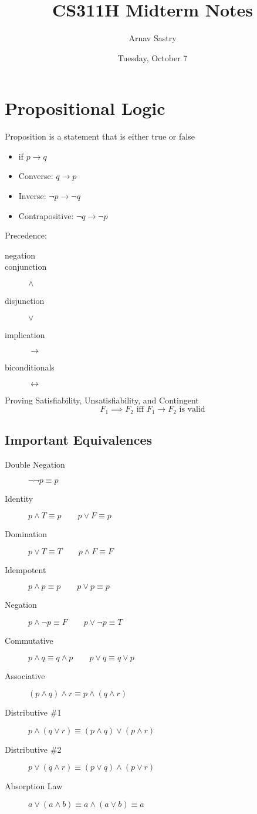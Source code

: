 \documentclass[a4paper]{article}
\title{CS311H Midterm Notes}
\author{Arnav Sastry}
\date{Tuesday, October 7}
\begin{document}
\maketitle

\section{Propositional Logic}
Proposition is a statement that is either true or false
\begin{itemize}
    \item if $p \to q$
    \item Converse: $q \to p$
    \item Inverse: $\neg p \to \neg q$
    \item Contrapositive: $\neg q \to \neg p$
\end{itemize}
Precedence:
\begin{description}
    \item[negation]
    \item[conjunction] $\land$
    \item[disjunction] $\lor$
    \item[implication] $\to$
    \item[biconditionals] $\leftrightarrow$
\end{description}
Proving Satisfiability, Unsatisfiability, and Contingent
\[ F_1 \implies F_2 \text{ iff } F_1 \to F_2 \text{ is valid}\]
\subsection{Important Equivalences}
\begin{description}
    \item[Double Negation] $\neg \neg p \equiv p$
    \item[Identity] $p \land T \equiv p \qquad p \lor F \equiv p$
    \item[Domination] $p \lor T \equiv T \qquad p \land F \equiv F$
    \item[Idempotent] $p \land p \equiv p \qquad p \lor p \equiv p$
    \item[Negation] $p \land \neg p \equiv F \qquad p \lor \neg p \equiv T$
    \item[Commutative] $p \land q \equiv q \land p \qquad p \lor q \equiv q \lor p$
    \item[Associative] $(p \land q) \land r \equiv p \land (q \land r)$
    \item[Distributive \#1] $p \land (q \lor r) \equiv (p \land q) \lor (p \land r)$
    \item[Distributive \#2] $p \lor (q \land r) \equiv (p \lor q) \land (p \lor r)$
    \item[Absorption Law] $a \lor (a \land b) \equiv a \land (a \lor b) \equiv a$
\end{description}
\end{document}
